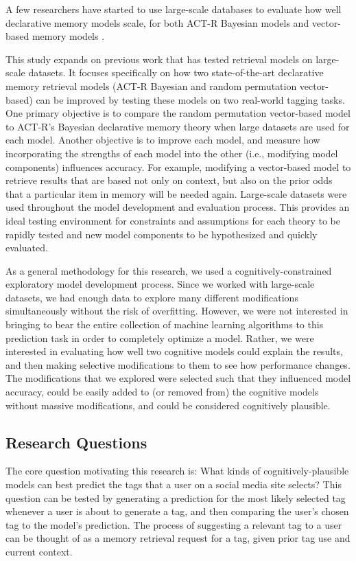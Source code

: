 \documentclass[man,floatsintext,donotrepeattitle]{apa6}
\begin{document}
A few researchers have started to use large-scale databases to evaluate how well declarative memory models scale,
for both ACT-R Bayesian models \parencites{Fu2007,Pirolli2003,Stanley2013,Douglass2010} and vector-based memory models \parencites{Jones2007,Rutledge2008,Recchia2010,Sahlgren2008}.

This study expands on previous work that has tested retrieval models on large-scale datasets.
It focuses specifically on how two state-of-the-art declarative memory retrieval models (ACT-R Bayesian and random permutation vector-based) can be improved by testing these models on two real-world tagging tasks.
One primary objective is to compare the random permutation vector-based model to ACT-R's Bayesian declarative memory theory when large datasets are used for each model. 
Another objective is to improve each model, and measure how incorporating the strengths of each model into the other (i.e., modifying model components) influences accuracy.
For example, modifying a vector-based model to retrieve results that are based not only on context, but also on the prior odds that a particular item in memory will be needed again.
Large-scale datasets were used throughout the model development and evaluation process.
This provides an ideal testing environment for constraints and assumptions for each theory to be rapidly tested and new model components to be hypothesized and quickly evaluated.

As a general methodology for this research, we used a cognitively-constrained exploratory model development process.
Since we worked with large-scale datasets, we had enough data to explore many different modifications simultaneously without the risk of overfitting.
However, we were not interested in bringing to bear the entire collection of machine learning algorithms to this prediction task in order to completely optimize a model.
Rather, we were interested in evaluating how well two cognitive models could explain the results, and then making selective modifications to them to see how performance changes.
The modifications that we explored were selected such that they influenced model accuracy, could be easily added to (or removed from) the cognitive models without massive modifications, and could be considered cognitively plausible.

\subsection{Research Questions}

The core question motivating this research is:
What kinds of cognitively-plausible models can best predict the tags that a user on a social media site selects?
This question can be tested by generating a prediction for the most likely selected tag whenever a user is about to generate a tag, and then comparing the user's chosen tag to the model's prediction.
The process of suggesting a relevant tag to a user can be thought of as a memory retrieval request for a tag, given prior tag use and current context.
\end{document}

